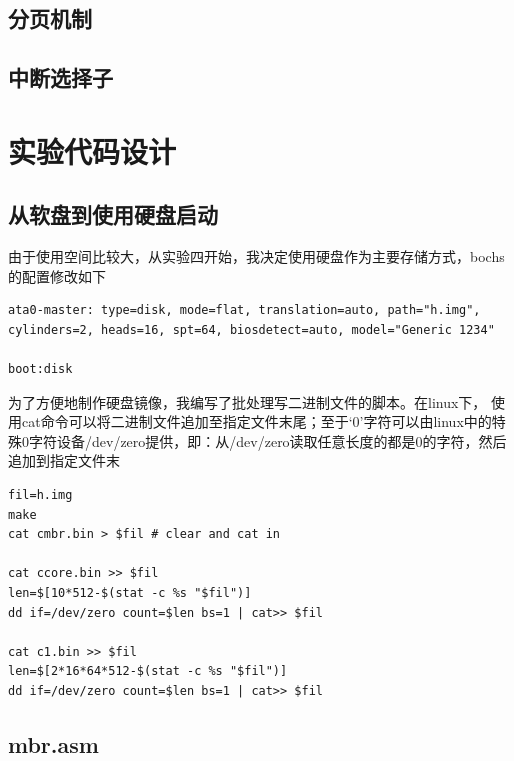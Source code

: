 \documentclass[a4paper,11pt,UTF8]{ctexart}
\begin{document}
	\subsection{分页机制}

	\subsection{中断选择子}

	
	

\section{实验代码设计}
	\subsection{从软盘到使用硬盘启动}
	由于使用空间比较大，从实验四开始，我决定使用硬盘作为主要存储方式，bochs的配置修改如下
	\begin{lstlisting}[caption={bochs硬盘配置参数},tabsize=4,basicstyle=\footnotesize,captionpos=b]
ata0-master: type=disk, mode=flat, translation=auto, path="h.img", cylinders=2, heads=16, spt=64, biosdetect=auto, model="Generic 1234"

boot:disk	
	\end{lstlisting}

	为了方便地制作硬盘镜像，我编写了批处理写二进制文件的脚本。在linux下， 使用cat命令可以将二进制文件追加至指定文件末尾；至于‘0’字符可以由linux中的特殊0字符设备/dev/zero提供，即：从/dev/zero读取任意长度的都是0的字符，然后追加到指定文件末
	\begin{lstlisting}[caption={make diskimg.sh},tabsize=4,basicstyle=\footnotesize,captionpos=b]
fil=h.img
make
cat cmbr.bin > $fil # clear and cat in

cat ccore.bin >> $fil
len=$[10*512-$(stat -c %s "$fil")]
dd if=/dev/zero count=$len bs=1 | cat>> $fil

cat c1.bin >> $fil
len=$[2*16*64*512-$(stat -c %s "$fil")]
dd if=/dev/zero count=$len bs=1 | cat>> $fil
	\end{lstlisting}

	\subsection{mbr.asm}
\end{document}
